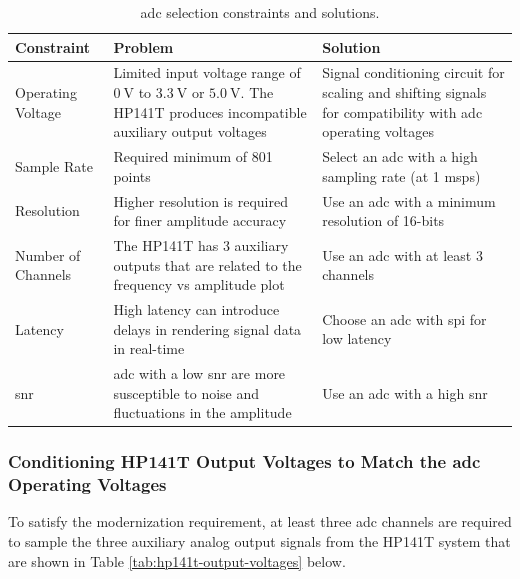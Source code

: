 \documentclass[class=report,11pt,crop=false]{standalone}
\begin{document}
	\begin{table}[!ht]
		\centering
		\begin{tabular}{|m{8em}|m{15em}|m{15em}|}
			\hline
			\textbf{Constraint}	& \textbf{Problem}	& \textbf{Solution}\\
			\hline
			Operating Voltage	& Limited input voltage range of $\SI{0}{\volt}$ to $\SI{3.3}{\volt}$ or $\SI{5.0}{\volt}$. The HP141T produces incompatible auxiliary output voltages	& Signal conditioning circuit for scaling and shifting signals for compatibility with \acrshort{adc} operating voltages\\
			\hline
			Sample Rate			& Required minimum of 801 points & Select an \acrshort{adc} with a high sampling rate (at 1 \acrshort{msps}) \\
			\hline
			Resolution			& Higher resolution is required for finer amplitude accuracy	& Use an \acrshort{adc} with a minimum resolution of 16-bits\\
			\hline
			Number of Channels	& The HP141T has 3 auxiliary outputs that are related to the frequency vs amplitude plot 	& Use an \acrshort{adc} with at least 3 channels\\
			\hline
			Latency				& High latency can introduce delays in rendering signal data in real-time	& Choose an \acrshort{adc} with \acrshort{spi} for low latency\\
			\hline
			\acrshort{snr}	& \acrshort{adc} with a low \acrshort{snr} are more susceptible to noise and fluctuations in the amplitude 	&	Use an \acrshort{adc} with a high \acrshort{snr}\\
			\hline
		\end{tabular}
		\label{tab:adc-constraints}
		\caption{\acrshort{adc} selection constraints and solutions.}
	\end{table}

	\subsubsection{Conditioning HP141T Output Voltages to Match the \acrshort{adc} Operating Voltages}
	
	To satisfy the modernization requirement, at least three \acrshort{adc} channels are required to sample the three auxiliary analog output signals from the HP141T system that are shown in Table \ref{tab:hp141t-output-voltages} below.
	
\end{document}
